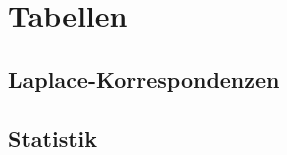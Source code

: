 \chapter{Tabellen}
\section{Laplace-Korrespondenzen}


\clearpage

\section{Statistik}


\clearpage


